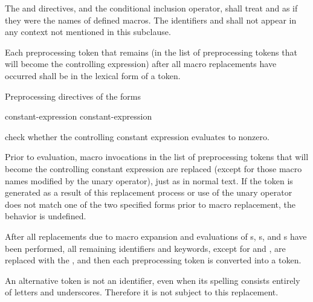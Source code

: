 \documentclass{wg21}
\newcommand{\clb}[1]{\removed{#1} \added{\grammarterm{line-break}}}
\begin{document}
\pnum
The  and  directives, and
the  conditional inclusion operator,
shall treat  and 
as if they were the names of defined macros.
The identifiers  and 
shall not appear in any context not mentioned in this subclause.

\pnum
Each preprocessing token that remains (in the list of preprocessing tokens that
will become the controlling expression)
after all macro replacements have occurred
shall be in the lexical form of a token.

\pnum
Preprocessing directives of the forms
\begin{ncsimplebnf}\obeyspaces
     constant-expression \clb{new-line} \br
     constant-expression \clb{new-line} 
\end{ncsimplebnf}
check whether the controlling constant expression evaluates to nonzero.

\pnum
Prior to evaluation,
macro invocations in the list of preprocessing tokens
that will become the controlling constant expression
are replaced
(except for those macro names modified by the
unary operator),
just as in normal text.
If the token
is generated as a result of this replacement process
or use of the
unary operator does not match one of the two specified forms
prior to macro replacement,
the behavior is undefined.

\pnum
After all replacements due to macro expansion and
evaluations of
s,
s, and
s
have been performed,
all remaining identifiers and keywords,
except for
and
,
are replaced with the 
,
and then each preprocessing token is converted into a token.
\begin{note}
    An alternative
    token is not an identifier,
    even when its spelling consists entirely of letters and underscores.
    Therefore it is not subject to this replacement.
\end{note}
\end{document}
